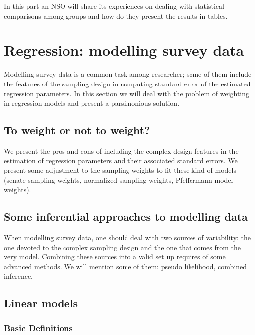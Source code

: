 \documentclass[
  12pt,
]{book}
\begin{document}
In this part an NSO will share its experiences on dealing with statistical comparisons among groups and how do they present the results in tables.

\hypertarget{regression-modelling-survey-data}{%
\chapter{Regression: modelling survey data}\label{regression-modelling-survey-data}}

Modelling survey data is a common task among researcher; some of them include the features of the sampling design in computing standard error of the estimated regression parameters. In this section we will deal with the problem of weighting in regression models and present a parsimonious solution.

\hypertarget{to-weight-or-not-to-weight}{%
\section{To weight or not to weight?}\label{to-weight-or-not-to-weight}}

We present the pros and cons of including the complex design features in the estimation of regression parameters and their associated standard errors. We present some adjustment to the sampling weights to fit these kind of models (senate sampling weights, normalized sampling weights, Pfeffermann model weights).

\hypertarget{some-inferential-approaches-to-modelling-data}{%
\section{Some inferential approaches to modelling data}\label{some-inferential-approaches-to-modelling-data}}

When modelling survey data, one should deal with two sources of variability: the one devoted to the complex sampling design and the one that comes from the very model. Combining these sources into a valid set up requires of some advanced methods. We will mention some of them: pseudo likelihood, combined inference.

\hypertarget{linear-models}{%
\section{Linear models}\label{linear-models}}

\hypertarget{basic-definitions}{%
\subsection{Basic Definitions}\label{basic-definitions}}
\end{document}
